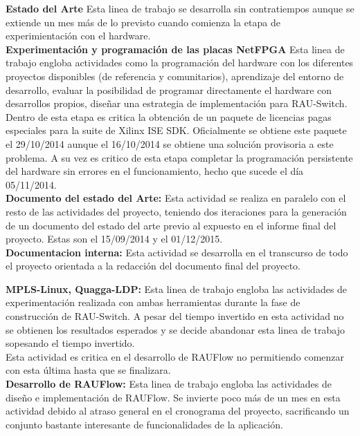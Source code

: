 \textbf{Estado del Arte} Esta linea de trabajo se desarrolla sin contratiempos aunque se extiende un mes m\'as de lo previsto cuando comienza la etapa de experimientaci\'on con el hardware.\\ 
  
\textbf{Experimentaci\'on y programaci\'on de las placas NetFPGA} Esta linea de trabajo engloba actividades como la programaci\'on del hardware con los diferentes proyectos disponibles (de referencia y comunitarios), aprendizaje del entorno de desarrollo, evaluar la posibilidad de programar directamente el hardware con desarrollos propios, diseñar una estrategia de implementaci\'on para RAU-Switch.\\

Dentro de esta etapa es critica la obtenci\'on de un paquete de licencias pagas especiales para la suite de Xilinx ISE SDK. Oficialmente se obtiene este paquete el 29/10/2014 aunque el 16/10/2014 se obtiene una soluci\'on provisoria a este problema. A su vez es critico de esta etapa completar la programaci\'on persistente del hardware sin errores en el funcionamiento, hecho que sucede el día 05/11/2014.\\

\textbf{Documento del estado del Arte:} Esta actividad se realiza en paralelo con el resto de las actividades del proyecto, teniendo dos iteraciones para la generación de un documento del estado del arte previo al expuesto en el informe final del proyecto. Estas son el 15/09/2014 y el 01/12/2015.\\

\textbf{Documentacion interna:} Esta actividad se desarrolla en el transcurso de todo el proyecto orientada a la redacci\'on del documento final del proyecto.

\textbf{MPLS-Linux, Quagga-LDP:} Esta linea de trabajo engloba las actividades de experimentaci\'on realizada con ambas herramientas durante la fase de construcci\'on de RAU-Switch. A pesar del tiempo invertido en esta actividad no se obtienen los resultados esperados y se decide abandonar esta linea de trabajo sopesando el tiempo invertido.\\

Esta actividad es critica en el desarrollo de RAUFlow no permitiendo comenzar con esta \'ultima hasta que se finalizara.\\

\textbf{Desarrollo de RAUFlow:} Esta linea de trabajo engloba las actividades de diseño e implementaci\'on de RAUFlow. Se invierte poco m\'as de un mes en esta actividad debido al atraso general en el cronograma del proyecto, sacrificando un conjunto bastante interesante de funcionalidades de la aplicaci\'on.

